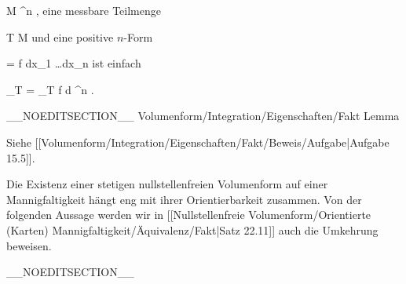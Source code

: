 \mavergleichskette
{\vergleichskette
{ M
}
{ \subseteq }{ \R^n
}
{  }{
}
{    }{
}
{   }{
}
}
{}{}{,}
eine messbare Teilmenge

\mavergleichskette
{\vergleichskette
{ T
}
{ \subseteq }{ M
}
{  }{
}
{    }{
}
{   }{
}
}
{}{}{}
und eine positive $n$-Form

\mavergleichskette
{\vergleichskette
{ \omega
}
{ = }{ f dx_1 \wedge \ldots \wedge dx_n
}
{  }{
}
{    }{
}
{   }{
}
}
{}{}{}
ist einfach

\mavergleichskettedisp
{\vergleichskette
{ \int_T \omega
}
{ =} { \int_T f d \lambda^n
}
{ } {
}
{ } {
}
{ } {
}
}
{}{}{.}

__NOEDITSECTION__
{Volumenform/Integration/Eigenschaften/Fakt}
{Lemma}
{}
{

\faktzusatz {}
\faktzusatz {}

 }
{ Siehe [[Volumenform/Integration/Eigenschaften/Fakt/Beweis/Aufgabe|Aufgabe 15.5]]. }


Die Existenz einer stetigen nullstellenfreien Volumenform auf einer Mannigfaltigkeit hängt eng mit ihrer Orientierbarkeit zusammen. Von der folgenden Aussage werden wir in
[[Nullstellenfreie Volumenform/Orientierte (Karten) Mannigfaltigkeit/Äquivalenz/Fakt|Satz 22.11]]
auch die Umkehrung beweisen.

__NOEDITSECTION__

